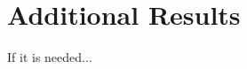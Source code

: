 
\lhead[\chaptername~\thechapter]{\rightmark}

\rhead[\leftmark]{}

\lfoot[\thepage]{}

\cfoot{}

\rfoot[]{\thepage}

\chapter{Additional Results\label{Appen}}

If it is needed...